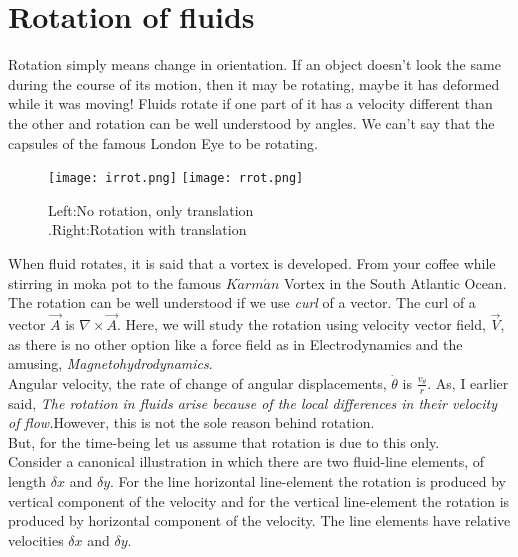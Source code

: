 \documentclass{book}
\begin{document}
\section{Rotation of fluids}
Rotation simply means change in orientation. If an object doesn't look the same during the course of its motion, then it may be rotating, maybe it has deformed while it was moving! Fluids rotate if one part of it has a velocity different than the other and rotation can be well understood by angles. We can't say that the capsules of the famous London Eye to be rotating. \\
\begin{center}
\begin{figure}[h]
\texttt{[image: irrot.png]}
\texttt{[image: rrot.png]}
\caption{Left:No rotation, only translation\\ .Right:Rotation with translation}
\end{figure}
\end{center}
When fluid rotates, it is said that a vortex is developed. From your coffee while stirring in moka pot to the famous $K\acute{a}rm\acute{a}n$ Vortex in the South Atlantic Ocean.
\\
\hspace{0.8cm}
The rotation can be well understood if we use \emph{curl} of a vector. The curl of a vector $\vec{A}$ is $\nabla \times \vec{A}$. Here, we will study the rotation using velocity vector field, $\vec{V}$, as there is no other option like a force field as in Electrodynamics and the amusing, \emph{Magnetohydrodynamics}.\\
Angular velocity, the rate of change of angular displacements, $\dot{\theta}$ is $\frac{v_\theta}{r}$. As, I  earlier said, \emph{The rotation in fluids arise because of the local differences in their velocity of flow.}However, this is not the sole reason behind rotation. \\
But, for the time-being let us assume that rotation is due to this only.\\
Consider a canonical illustration in which there are two fluid-line elements, of length $\delta x$ and $\delta y$. For the line horizontal line-element the rotation is produced by vertical component of the velocity and for the  vertical line-element the rotation is produced by horizontal component of the velocity. The line elements have relative velocities $\delta x$ and $\delta y$.
\begin{center}
\end{center}
\end{document}
